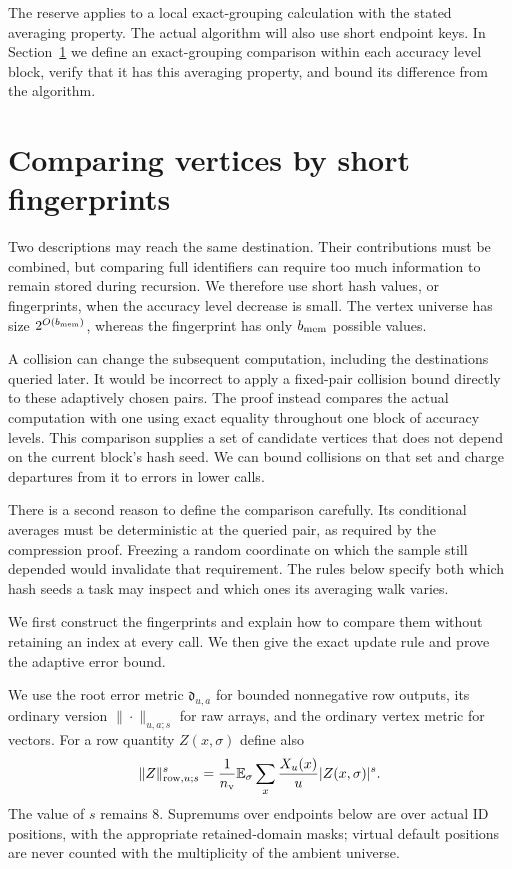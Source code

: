 \documentclass[11pt]{article}
\numberwithin{equation}{section}
\theoremstyle{definition}
\theoremstyle{remark}
\begin{document}
The reserve applies to a local exact-grouping calculation with the stated
averaging property.  The actual algorithm will also use short endpoint
keys.  In Section~\ref{sec:fp-blocks} we define an exact-grouping comparison
within each accuracy level block, verify that it has this averaging property, and
bound its difference from the algorithm.





\section{Comparing vertices by short fingerprints}
\label{sec:fp-blocks}

Two descriptions may reach the same destination. Their contributions must be combined, but comparing full identifiers can require too much information to remain stored during recursion. We therefore use short hash values, or fingerprints, when the accuracy level decrease is small. The vertex universe has size $2^{O({b_{\rm mem}})}$, whereas the fingerprint has only ${b_{\rm mem}}$ possible values.

A collision can change the subsequent computation, including the destinations queried later. It would be incorrect to apply a fixed-pair collision bound directly to these adaptively chosen pairs. The proof instead compares the actual computation with one using exact equality throughout one block of accuracy levels. This comparison supplies a set of candidate vertices that does not depend on the current block's hash seed. We can bound collisions on that set and charge departures from it to errors in lower calls.

There is a second reason to define the comparison carefully. Its conditional averages must be deterministic at the queried pair, as required by the compression proof. Freezing a random coordinate on which the sample still depended would invalidate that requirement. The rules below specify both which hash seeds a task may inspect and which ones its averaging walk varies.

We first construct the fingerprints and explain how to compare them without retaining an index at every call. We then give the exact update rule and prove the adaptive error bound.

We use the root error metric $\mathfrak d_{u,a}$ for bounded nonnegative row
outputs, its ordinary version $\|\cdot\|_{u,a;s}$ for raw arrays, and the
ordinary vertex metric for vectors.  For a row quantity $Z(x,\sigma)$ define
also
\begin{equation}
 \|Z\|_{\mathrm{row},u;s}^s
 =\frac1{n_{\rm v}}\mathbb E_\sigma\sum_x\frac{X_u(x)}u|Z(x,\sigma)|^s.
 \label{eq:fp-row-measure}
\end{equation}
The value of $s$ remains $8$.  Supremums over endpoints below are over actual
ID positions, with the appropriate retained-domain masks; virtual default
positions are never counted with the multiplicity of the ambient universe.
\end{document}
